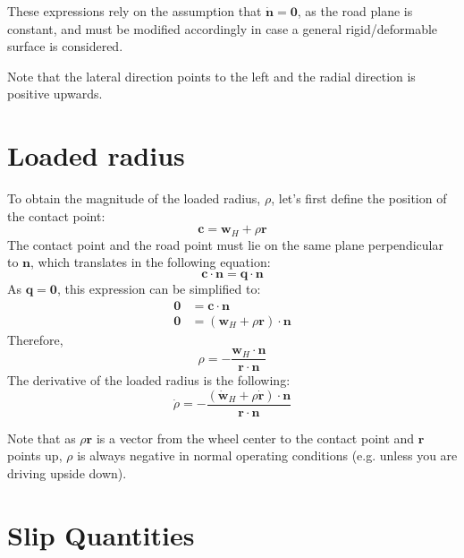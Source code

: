 These expressions rely on the assumption that $\dot{\mathbf{n}} = \mathbf{0}$, as the road plane is constant, and must be modified accordingly in case a general rigid/deformable surface is considered.

Note that the lateral direction points to the left and the radial direction is positive upwards.

\section{Loaded radius}
To obtain the magnitude of the loaded radius, $\rho$, let's first define the position of the contact point:
\begin{equation}
    \mathbf{c} = \mathbf{w}_H + \rho\mathbf{r}
\end{equation}
The contact point and the road point must lie on the same plane perpendicular to $\mathbf{n}$, which translates in the following equation:
\begin{equation}
    \mathbf{c} \cdot \mathbf{n} = \mathbf{q} \cdot \mathbf{n}
\end{equation}
As $\mathbf{q} = \mathbf{0}$, this expression can be simplified to:
\begin{equation}
    \begin{split}
        \mathbf{0} &= \mathbf{c} \cdot \mathbf{n} \\
        \mathbf{0} &= \left(\mathbf{w}_H + \rho\mathbf{r}\right) \cdot \mathbf{n}
    \end{split}
\end{equation}
Therefore,
\begin{equation}
    \rho = -\frac{\mathbf{w}_H \cdot \mathbf{n}}{\mathbf{r} \cdot \mathbf{n}}
\end{equation}
The derivative of the loaded radius is the following:
\begin{equation}
    \dot{\rho} = -\frac{\left(\dot{\mathbf{w}}_H  + \rho \dot{\mathbf{r}}\right)\cdot \mathbf{n}}{\mathbf{r} \cdot \mathbf{n}}
\end{equation}

Note that as $\rho\mathbf{r}$ is a vector from the wheel center to the contact point and $\mathbf{r}$ points up, $\rho$ is always negative in normal operating conditions (e.g. unless you are driving upside down).

\section{Slip Quantities}

